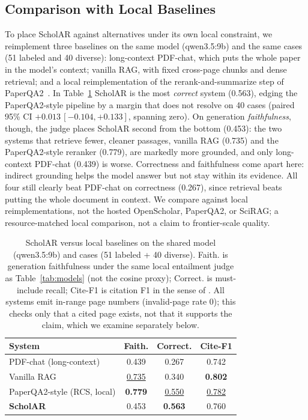 \documentclass[11pt,letterpaper]{article}
\newcommand{\best}[1]{\textbf{#1}}
\newcommand{\snd}[1]{\underline{#1}}
\begin{document}
\subsection{Comparison with Local Baselines}
\label{sec:auto-compare}
To place ScholAR against alternatives under its own local constraint, we reimplement
three baselines on the same model (qwen3.5:9b) and the same cases (51 labeled and 40
diverse): long-context PDF-chat, which puts the whole paper in the model's context;
vanilla RAG, with fixed cross-page chunks and dense retrieval; and a local
reimplementation of the rerank-and-summarize step of PaperQA2~\citep{lala2024paperqa2}.
In Table~\ref{tab:compare} ScholAR is the most \emph{correct} system (0.563), edging the
PaperQA2-style pipeline by a margin that does not resolve on 40 cases (paired 95\% CI
$+0.013\,[-0.104,+0.133]$, spanning zero). On generation \emph{faithfulness}, though, the judge
places ScholAR second from the bottom (0.453): the two systems that retrieve fewer, cleaner
passages, vanilla RAG (0.735) and the PaperQA2-style reranker (0.779), are markedly more grounded,
and only long-context PDF-chat (0.439) is worse. Correctness and faithfulness come apart here:
indirect grounding helps the model answer but not stay within its evidence. All four still
clearly beat PDF-chat on correctness (0.267), since retrieval beats putting the whole document in context. We compare
against local reimplementations, not the hosted OpenScholar, PaperQA2, or SciRAG; a resource-matched
local comparison, not a claim to frontier-scale quality.

\begin{table}[t]
  \centering
  \caption{ScholAR versus local baselines on the shared model (qwen3.5:9b) and cases
           (51 labeled + 40 diverse). Faith. is generation faithfulness under the same local
           entailment judge as Table~\ref{tab:models} (not the cosine proxy); Correct. is
           must-include recall; Cite-F1 is citation F1 in the sense of
           \citet{gao2023attributing}. All systems emit in-range page numbers
           (invalid-page rate 0); this checks only that a cited page exists, not that it
           supports the claim, which we examine separately below.}
  \label{tab:compare}
  \setlength{\tabcolsep}{3pt}
  \begin{tabular}{lccc}
    \toprule
    \textbf{System} & \textbf{Faith.} & \textbf{Correct.} & \textbf{Cite-F1} \\
    \midrule
    PDF-chat (long-context)      & 0.439 & 0.267 & 0.742 \\
    Vanilla RAG                  & \snd{0.735} & 0.340 & \best{0.802} \\
    PaperQA2-style (RCS, local)  & \best{0.779} & \snd{0.550} & \snd{0.782} \\
    \textbf{ScholAR}             & 0.453 & \best{0.563} & 0.760 \\
    \bottomrule
  \end{tabular}
\end{table}
\end{document}
